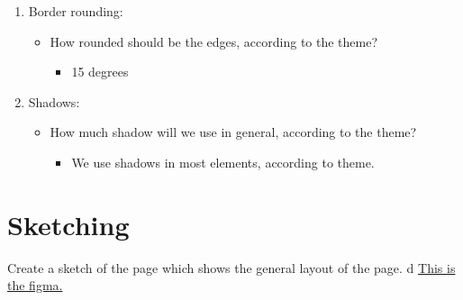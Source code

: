 \documentclass{article}
\begin{document}
\begin{enumerate}
\begin{itemize}
\begin{itemize}
        \end{itemize}
    \end{itemize}
    \item Border rounding:
    \begin{itemize}
        \item How rounded should be the edges, according to the theme?
        \begin{itemize}
            \item 15 degrees
        \end{itemize}
    \end{itemize}
        \item Shadows:
    \begin{itemize}
        \item How much shadow will we use in general, according to the theme?
        \begin{itemize}
            \item We use shadows in most elements, according to theme.
        \end{itemize}
    \end{itemize}
\end{enumerate}

\section{Sketching}
Create a sketch of the page which shows the general layout of the page.
d
\href{https://www.figma.com/design/Bad0CJ6dLRK9TCG3znJ58A/Rental-Roulette?node-id=5-2&t=mhheIDBxt3o2sYmw-0https://www.figma.com/design/Bad0CJ6dLRK9TCG3znJ58A/Rental-Roulette?node-id=5-2&t=mhheIDBxt3o2sYmw-0}{This is the figma.}
\end{document}
